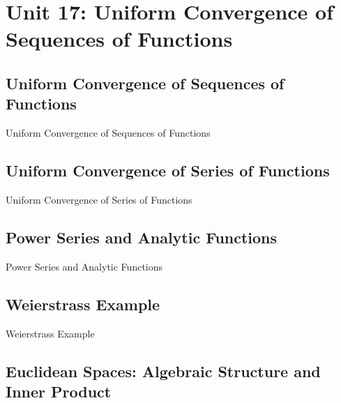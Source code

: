 \chapter{Unit 17: Uniform Convergence of Sequences of Functions}
\label{chap:unit17}

\section{Uniform Convergence of Sequences of Functions}
\label{sec:uniform-convergence-of-sequences-of-functions}

Uniform Convergence of Sequences of Functions

\section{Uniform Convergence of Series of Functions}
\label{sec:uniform-convergence-of-series-of-functions}

Uniform Convergence of Series of Functions

\section{Power Series and Analytic Functions}
\label{sec:power-series-and-analytic-functions}

Power Series and Analytic Functions

\section{Weierstrass Example}
\label{sec:weierstrass-example}

Weierstrass Example

\section{Euclidean Spaces: Algebraic Structure and Inner Product}
\label{sec:euclidean-spaces-algebraic-structure-and-inner-product}

